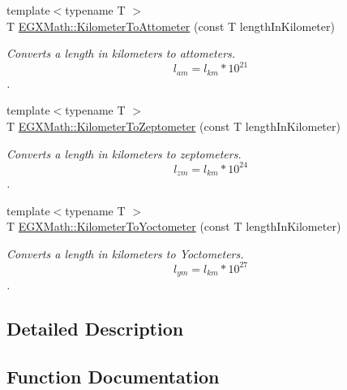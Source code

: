 \begin{DoxyCompactItemize}
{\footnotesize template$<$typename T $>$ }\\T \mbox{\hyperlink{group___e_g_x_math-_conversions-_length_conversions-_kilometer-_s_i_ga73569efb1cfc6e4972fe1cde86f221bd}{E\+G\+X\+Math\+::\+Kilometer\+To\+Attometer}} (const T length\+In\+Kilometer)
\begin{DoxyCompactList}\small\item\em Converts a length in kilometers to attometers. \[ l_{am}=l_{km} * 10^{21} \]. \end{DoxyCompactList}\item 
{\footnotesize template$<$typename T $>$ }\\T \mbox{\hyperlink{group___e_g_x_math-_conversions-_length_conversions-_kilometer-_s_i_ga377d2c4ad2db833c5a7c16861600da49}{E\+G\+X\+Math\+::\+Kilometer\+To\+Zeptometer}} (const T length\+In\+Kilometer)
\begin{DoxyCompactList}\small\item\em Converts a length in kilometers to zeptometers. \[ l_{zm}=l_{km} * 10^{24} \]. \end{DoxyCompactList}\item 
{\footnotesize template$<$typename T $>$ }\\T \mbox{\hyperlink{group___e_g_x_math-_conversions-_length_conversions-_kilometer-_s_i_gaf03c100edda155de40290d8c3e155a27}{E\+G\+X\+Math\+::\+Kilometer\+To\+Yoctometer}} (const T length\+In\+Kilometer)
\begin{DoxyCompactList}\small\item\em Converts a length in kilometers to Yoctometers. \[ l_{ym}=l_{km} * 10^{27} \]. \end{DoxyCompactList}\end{DoxyCompactItemize}


\subsection{Detailed Description}


\subsection{Function Documentation}
\mbox{\label{group___e_g_x_math-_conversions-_length_conversions-_kilometer-_s_i_ga73569efb1cfc6e4972fe1cde86f221bd}} 
